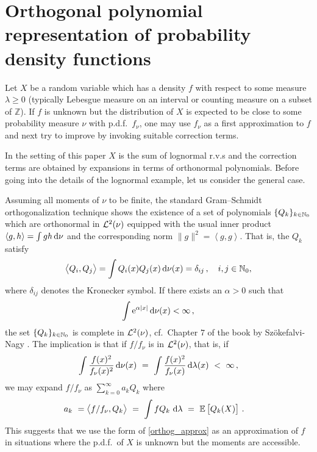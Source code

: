 \section{Orthogonal polynomial representation of probability density functions}
\label{S:OrthPol}

Let $X$ be a random variable which has a density $f$
with respect to some measure $\lambda\ge 0$
(typically Lebesgue measure on an interval or counting measure
on a subset of $\mathbb{Z}$).  If $f$ is unknown but the distribution of $X$ is
expected to be close to some probability measure $\nu$ with p.d.f.\ $f_{\nu}$,
one may use $f_{\nu}$ as a first approximation to $f$ and next try
to improve by invoking suitable correction terms.

In the setting of this paper $X$ is the sum of lognormal r.v.s and the correction terms are obtained by expansions in terms of orthonormal polynomials.
Before going into the details of the lognormal example, let us consider the general case.

Assuming all moments of $\nu$ to be finite,
the standard Gram--Schmidt orthogonalization technique shows the existence
of a set of polynomials $\{Q_k\}_{k\in\mathbb{N}_0}$ which are orthonormal in
$\mathcal{L}^{2}(\nu)$ equipped with the usual inner product
$\left<g,h\right>=\int gh \dif \nu$ and the corresponding norm
$\|g\|^2=\left<g,g\right>$. That is,
the $Q_k$ satisfy
\begin{equation}\label{OrthogonalityCondition}
\left<Q_i,Q_j\right>=\int Q_i(x)Q_j(x) \dif \nu(x)=\delta_{ij} \,, \quad i, j \in\NZ,
\end{equation}
where $\delta_{ij}$ denotes the Kronecker symbol.
If there exists an $\alpha>0$ such that
\begin{equation}\label{DefinedMGFCondition}
\int \e^{\alpha|x|} \dif \nu(x) < \infty\,,
\end{equation}
the set  $\{Q_k\}_{k\in\mathbb{N}_0}$ is complete in $\mathcal{L}^{2}(\nu)$, cf.\ Chapter $7$ of the book by Sz{\"o}kefalvi-Nagy \cite{Na65}. The implication is that if $f/f_\nu$ is in $\mathcal{L}^{2}(\nu)$, that is, if
\begin{equation}\label{L2Condition1}
\int \frac{f(x)^2}{f_\nu(x)^2}\dif \nu(x)\ =\ \int \frac{f(x)^2}{f_\nu(x)}\dif \lambda(x)\ <\ \infty\,,
\end{equation}
we may expand $f/f_\nu$ as $\sum_{k=0}^\infty a_k Q_k$ where
\begin{align}\label{28.10a}a_k\ &=
\left<f/f_\nu,Q_k\right>\ =\ \int f Q_k\,\dif\lambda\ =\ \Exp\left[Q_k(X)\right]\,.
\end{align}
This suggests that we use the form of \eqref{orthog_approx} as an approximation of $f$ in situations where the p.d.f.\ of $X$ is unknown but the moments are accessible.

